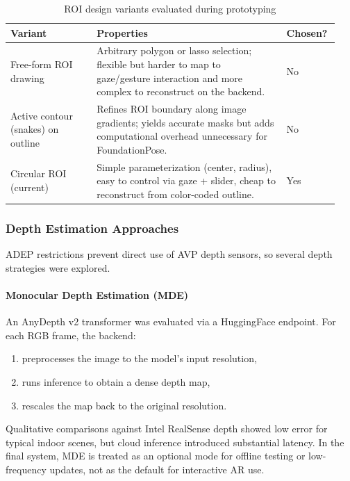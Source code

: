 \begin{table}[H]
    \centering
    \caption{ROI design variants evaluated during prototyping}
    \label{tab:roi-variants}
    \begin{tabular}{p{0.25\linewidth}p{0.55\linewidth}p{0.14\linewidth}}
        \toprule
        \textbf{Variant} & \textbf{Properties} & \textbf{Chosen?} \\
        \midrule
        Free-form ROI drawing &
        Arbitrary polygon or lasso selection; flexible but harder to map to gaze/gesture interaction and more complex to reconstruct on the backend. & No \\
        Active contour (snakes) on outline &
        Refines ROI boundary along image gradients; yields accurate masks but adds computational overhead unnecessary for FoundationPose. & No \\
        Circular ROI (current) &
        Simple parameterization (center, radius), easy to control via gaze + slider, cheap to reconstruct from color-coded outline. & Yes \\
        \bottomrule
    \end{tabular}
\end{table}

\subsubsection{Depth Estimation Approaches}

ADEP restrictions prevent direct use of AVP depth sensors, so several depth strategies were explored.

\paragraph*{Monocular Depth Estimation (MDE)}

An AnyDepth v2 transformer was evaluated via a HuggingFace endpoint. For each RGB frame, the backend:
\begin{enumerate}
    \item preprocesses the image to the model’s input resolution,
    \item runs inference to obtain a dense depth map,
    \item rescales the map back to the original resolution.
\end{enumerate}

Qualitative comparisons against Intel RealSense depth showed low error for typical indoor scenes, but cloud inference introduced substantial latency. In the final system, MDE is treated as an optional mode for offline testing or low-frequency updates, not as the default for interactive AR use.

